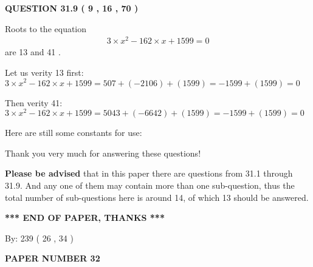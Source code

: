 \documentclass[12pt]{article}
\begin{document}
 
 
  
\vspace{0.2in}
  
{\textbf{\Large{QUESTION
31.9 
 (           9 ,          16 ,          70 )
}}}
  
  


 
 

Roots to the equation
\begin{eqnarray*}
3 \times x^2  %
-162
                 \times x    %
+  %
1599 =0
\end{eqnarray*}
are  %
13 and  %
41 .
 
Let us verity  %
13 first:
$  %
3 \times x^2  %
-162
                 \times x    %
+  %
1599
  = %
507+( %
-2106)+( %
1599)
  = %
-1599+( %
1599)
  = %
0
$
 
Then verity  %
41:
$  %
3 \times x^2  %
-162
                 \times x    %
+  %
1599
  = %
5043+( %
-6642)+( %
1599)
  = %
-1599+( %
1599)
  = %
0
$
 
 
 
   
   
 \vspace{0.2in}
Here are still some constants for use:
 
 
 
 
Thank you very much for answering these questions!
 
{\textbf{\large{Please be advised}}} that in this paper there are questions from
31.1 through
31.9.
And any one of them may contain more than one sub-question, thus the total number
of sub-questions here is around 14, of which
13 should be answered.
 
   
   
   
   
\vspace{1.0in} 
{\textbf{\large{ *** END OF PAPER, THANKS *** }}} 
   
   
\hspace{1.0in} By: 
         239 (          26 ,           34 )
   
   
   
   
\newpage 
\setcounter{page}{ 
    32001 } 
   
   
   
   
 {\textbf{ \Large{ PAPER NUMBER           32  }}}
   
   
\vspace{0.2in}
   
   
   
\end{document}
